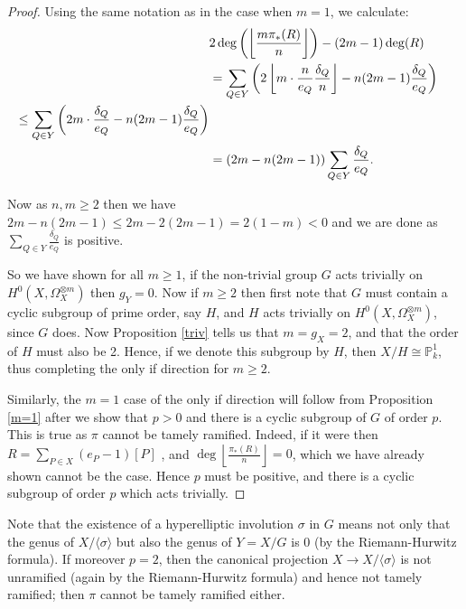 \begin{proof}
Using the same notation as in the case when $m=1$, we calculate:
\begin{align*}
\lefteqn{2\deg\left(\left\lfloor\frac{m\pi_*(R)}{n}\right\rfloor\right)-(2m-1)\deg(R)}\\
& = \sum_{Q \in Y} \left(2\left\lfloor m\cdot \frac{n}{e_Q}\frac{\delta_Q}{n}\right\rfloor -n(2m-1)\frac{\delta_Q}{e_Q}\right) \\
\leq   \sum_{Q\in Y}\left( 2m\cdot\frac{\delta_Q}{e_Q}-n(2m-1)\frac{\delta_Q}{e_Q}\right) \\
& =  (2m-n(2m-1))\sum_{Q\in Y }\frac{\delta_Q}{e_Q}.
\end{align*}

Now as $n,m\geq 2$ then we have $2m-n(2m-1)\leq 2m-2(2m-1)=2(1-m)<0$ and we are done as $\sum_{Q\in Y}\frac{\delta_Q}{e_Q}$ is positive.

So we have shown for all $m\geq 1$, if the non-trivial group $G$ acts trivially  on $H^0(X,\Omega_X^{\otimes m})$ then $g_Y=0$.
Now if $m\geq 2$ then first note that $G$ must contain a cyclic subgroup of prime order, say $H$, and $H$ acts trivially on $H^0(X,\Omega_X^{\otimes m})$, since $G$ does.
Now Proposition \ref{triv} tells us that $m=g_X=2$, and that the order of $H$ must also be 2.
Hence, if we denote this subgroup by $H$, then $X/H\cong \mathbb{P}_k^1$, thus completing the only if direction for $m\geq 2$.

Similarly, the $m=1$ case of the only if direction will follow from Proposition \ref{m=1} after we show that $p>0$ and there is a cyclic subgroup of $G$ of order $p$. 
This is true as $\pi$ cannot be tamely ramified.
Indeed, if it were then $R=\sum_{P\in X} (e_P-1)[P]$ \cite[Chap. IV, Cor. 2.4]{hart}, and $\deg\left\lfloor \frac{\pi_*(R)}{n} \right\rfloor=0$, which we have already shown cannot be the case.
Hence $p$ must be positive, and there is a cyclic subgroup of order $p$ which acts trivially.
\end{proof}

\begin{rem}
Note that the existence of a hyperelliptic involution $\sigma$ in $G$ means not only that the genus of $X/\langle \sigma \rangle$ but also the genus of $Y=X/G$ is $0$ (by the Riemann-Hurwitz formula).
If moreover $p=2$, then the canonical projection $X\rightarrow X/\langle \sigma \rangle$ is not unramified (again by the Riemann-Hurwitz formula) and hence not tamely ramified; then $\pi$ cannot be tamely ramified either.
\end{rem}


